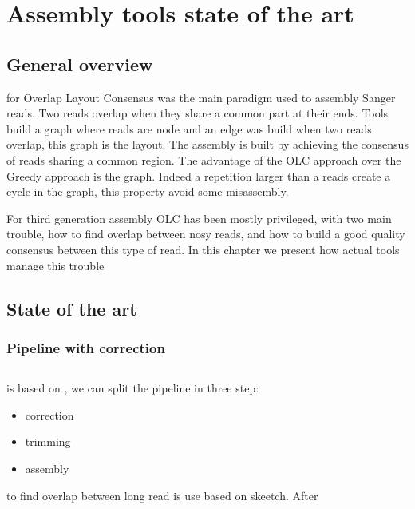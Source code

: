 \documentclass[main.tex]{subfiles}
\begin{document}
\chapter{Assembly tools state of the art}

\section{General overview}

\OLC for Overlap Layout Consensus was the main paradigm used to assembly Sanger reads.
Two reads overlap when they share a common part at their ends.
Tools build a graph where reads are node and an edge was build when two reads overlap, this graph is the layout. The assembly is built by achieving the consensus of reads sharing a common region. The advantage of the OLC approach over the Greedy approach is the graph. Indeed a repetition larger than a reads create a cycle in the graph, this property avoid some misassembly.


For third generation assembly OLC has been mostly privileged, with two main trouble, how to find overlap between nosy reads, and how to build a good quality consensus between this type of read. In this chapter we present how actual tools manage this trouble

\section{State of the art}

\subsection{Pipeline with correction}

\section{\canu}

\canu is based on , we can split the \canu pipeline in three step:
\begin{itemize}
    \item correction
    \item trimming
    \item assembly
\end{itemize}

to find overlap between long read is use \mhap based on skeetch. After
\end{document}
